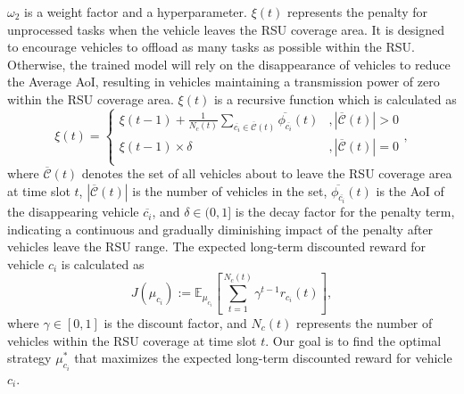 \documentclass[lettersize,journal,onecolumn]{IEEEtran}
\begin{document}
${{\omega }_{{2}}}$ is a weight factor and a hyperparameter. $\xi (t)$ represents the penalty for unprocessed tasks when the vehicle leaves the RSU coverage area. It is designed to encourage vehicles to offload as many tasks as possible within the RSU.
Otherwise, the trained model will rely on the disappearance of vehicles to reduce the Average AoI, resulting in vehicles maintaining a transmission power of zero within the RSU coverage area. $\xi (t)$ is a recursive function which is calculated as
\begin{equation}
\xi (t)=\left\{ \begin{array}{*{35}{l}}
   \xi (t-1)+\frac{1}{{{N}_{{c}}}\left( t \right)}\sum\limits_{\overline{{{c}_{i}}}\in \overline{\mathcal{C}}\left( {t} \right)}{\overline{{{\phi }_{\overline{{{c}_{i}}}}}}}(t) & ,\left| \overline{\mathcal{C}}\left( {t} \right) \right|>0  \\
   \xi (t-1)\times \delta  & ,\left| \overline{\mathcal{C}}\left( {t} \right) \right|=0  \\
\end{array} \right.
\label{eq24},
\end{equation}
where $\overline{\mathcal{C}}\left( {t} \right)$ denotes the set of all vehicles about to leave the RSU coverage area at time slot $t$, $\left| \overline{\mathcal{C}}\left( {t} \right) \right|$ is the number of vehicles in the set, $\overline{{{\phi }_{\overline{{{c}_{i}}}}}}\left( t \right)$ is the AoI of the disappearing vehicle $\overline{{{c}_{i}}}$, and $\delta \in (0,1]$ is the decay factor for the penalty term, indicating a continuous and gradually diminishing impact of the penalty after vehicles leave the RSU range.
The expected long-term discounted reward for vehicle ${{{c}}_{i}}$ is calculated as
\begin{equation}
J\left( {{\mu }_{{{c}_{i}}}} \right):={{\mathbb{E}}_{{{\mu }_{{{c}_{i}}}}}}\left[ \sum\limits_{t=1}^{{{N}_{c}}(t)}{{{\gamma }^{t-1}}}{{r}_{{{c}_{i}}}}(t) \right]
\label{eq25},
\end{equation}
where $\gamma \in [0,1]$ is the discount factor, and ${{N}_{c}}(t)$ represents the number of vehicles within the RSU coverage at time slot $t$. 
Our goal is to find the optimal strategy $\mu _{{{c}_{i}}}^{*}$ that maximizes the expected long-term discounted reward for vehicle ${{{c}}_{i}}$. 
\end{document}

